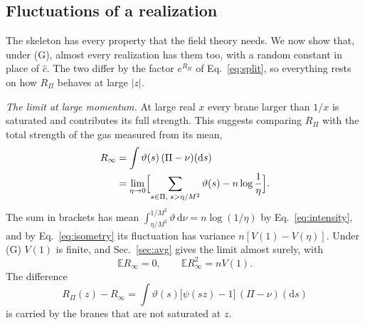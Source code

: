 \documentclass[a4paper,11pt]{article}
\newcommand{\bE}{\mathbb{E}}
\newcommand{\dd}{\mathrm{d}}
\begin{document}
\subsection{Fluctuations of a realization}
\label{sec:fluct}

The skeleton has every property that the field theory needs. We now show that, under (G), almost every realization has them too, with a random constant in place of $\hat c$. The two differ by the factor $e^{R_\Pi}$ of Eq.~\eqref{eq:split}, so everything rests on how $R_\Pi$ behaves at large $|z|$.

\textit{The limit at large momentum.} At large real $x$ every brane larger than $1/x$ is saturated and contributes its full strength. This suggests comparing $R_\Pi$ with the total strength of the gas measured from its mean,
\begin{equation}
\label{eq:Rinf}
\begin{aligned}
R_\infty&=\int\vartheta(s)\,(\Pi-\nu)(\dd s)\\
&=\lim_{\eta\to0}\Bigl[\sum_{s\in\Pi,\;s>\eta/M^2}\vartheta(s)-n\log\frac1\eta\Bigr].
\end{aligned}
\end{equation}
The sum in brackets has mean $\int_{\eta/M^2}^{1/M^2}\vartheta\,\dd\nu=n\log(1/\eta)$ by Eq.~\eqref{eq:intensity}, and by Eq.~\eqref{eq:isometry} its fluctuation has variance $n[V(1)-V(\eta)]$. Under (G) $V(1)$ is finite, and Sec.~\ref{sec:avg} gives the limit almost surely, with
\begin{equation}
\label{eq:Rinfstats}
\bE R_\infty=0,\qquad\bE R_\infty^2=nV(1).
\end{equation}
The difference
\begin{equation}
\label{eq:fdef}
R_\Pi(z)-R_\infty=\int\vartheta(s)\bigl[\psi(sz)-1\bigr]\,(\Pi-\nu)(\dd s)
\end{equation}
is carried by the branes that are not saturated at $z$.
\end{document}
